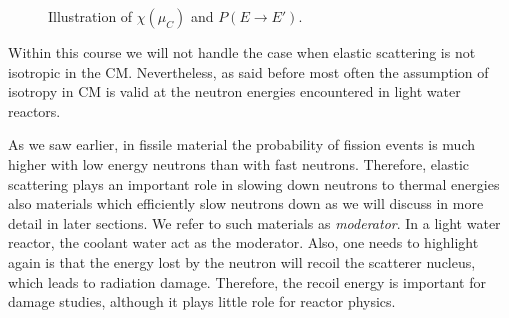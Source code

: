 \begin{figure}[ht!]
\protect {}\protect
\caption{\label{fig:isotroppdf} \footnotesize{Illustration of $\chi(\mu_C)$ and $P(E\rightarrow E')$.}}
\end{figure}

Within this course we will not handle the case when elastic scattering is not isotropic in the CM. Nevertheless, as said before most often the assumption of isotropy in CM is valid at the neutron energies encountered in light water reactors. 

As we saw earlier, in fissile material the probability of fission events is much higher with low energy neutrons than with fast neutrons. Therefore, elastic scattering plays an important role in slowing down neutrons to thermal energies also materials which efficiently slow neutrons down as we will discuss in more detail in later sections. We refer to such materials as \textit{moderator}. In a light water reactor, the coolant water act as the moderator. Also, one needs to highlight again is that the energy lost by the neutron will recoil the scatterer nucleus, which leads to radiation damage. Therefore, the recoil energy is important for damage studies, although it plays little role for reactor physics.

